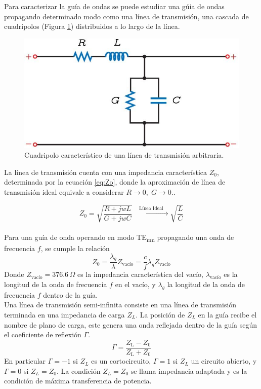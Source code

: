 \documentclass[11pt,a4paper]{article}
\begin{document}
\begin{multicols}{2}
Para caracterizar la guía de ondas se puede estudiar una gúia de ondas propagando determinado modo como una línea de transmisión, una cascada de cuadripolos (Figura \ref{fig:cuadri}) distribuidos a lo largo de la línea.
\begin{figure}[H]
\centering
\includegraphics[width=0.7\linewidth]{Images/linea de transm.jpeg}
\caption{Cuadripolo característico de una línea de transmisión arbitraria.}\label{fig:cuadri}
\end{figure}
La línea de transmisión cuenta con una impedancia característica $Z_0$, determinada por la ecuación \ref{eq:Zo}, donde la aproximación de línea de transmisión ideal equivale a considerar $R\rightarrow 0, \; G\rightarrow 0$.\cite{cheng_9}.

\begin{equation}\label{eq:Zo}
    Z_0=\sqrt{\frac{R+jwL}{G+jwC}}\xrightarrow{\quad\text{Línea Ideal} \quad}\sqrt{\frac{L}{C}}
\end{equation}\\[-1em]

Para una guía de onda operando en modo TE\textsubscript{mn} propagando una onda de frecuencia $f$, se cumple la relación
\begin{equation}
    Z_0=\frac{\lambda_g}{\lambda} Z_\text{vacío} = \frac{c}{f}\lambda_g Z_\text{vacío}
\end{equation}
Donde $Z_\text{vacío} = 376.6 \, \Omega$ es la impedancia característica del vacío, $\lambda_\text{vacío}$ 
es la longitud de la onda de frecuencia $f$ en el vacío, y $\lambda_g$ la longitud de la onda de frecuencia $f$ dentro de la guía.\cite{cheng_10}\\

Una línea de transmisión semi-infinita consiste en una línea de transmisión terminada en una impedancia de carga $Z_L$. 
La posición de $Z_L$ en la guía recibe el nombre de plano de carga, este genera una onda reflejada dentro de la guía según el coeficiente de reflexión $\Gamma$. 
\begin{equation}\label{eq:gamma}
    \Gamma = \frac{Z_\text{L}-Z_0}{Z_\text{L}+Z_0} 
\end{equation}
En particular $\Gamma = -1$ si $Z_L$ es un cortocircuito, $\Gamma = 1$ si $Z_L$ un circuito abierto, y $\Gamma = 0$ si $Z_L=Z_0$. La condición $Z_L=Z_0$ se llama impedancia adaptada y es la condición de máxima transferencia de potencia.\\ 


\end{multicols}
\end{document}
